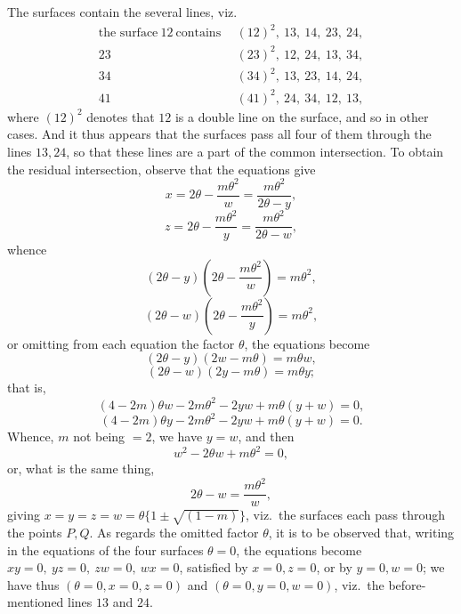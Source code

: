 \documentclass[11pt]{article}
\begin{document}
The surfaces contain the several lines, viz.
\begin{align*}
\text{the surface}\ 12\ \text{contains} &\ \ (12)^{2},\ 13,\ 14,\ 23,\ 24,\\
23\ &\ \ (23)^{2},\ 12,\ 24,\ 13,\ 34,\\
34\ &\ \ (34)^{2},\ 13,\ 23,\ 14,\ 24,\\
41\ &\ \ (41)^{2},\ 24,\ 34,\ 12,\ 13,
\end{align*}
where $(12)^{2}$ denotes that $12$ is a double line on the surface, and so in other
cases. And it thus appears that the surfaces pass all four of them through the lines
$13,24$, so that these lines are a part of the common intersection. To obtain the
residual intersection, observe that the equations give
\[
x=2\theta-\frac{m\theta^{2}}{w}=\frac{m\theta^{2}}{2\theta-y},
\]
\[
z=2\theta-\frac{m\theta^{2}}{y}=\frac{m\theta^{2}}{2\theta-w},
\]
whence
\[
(2\theta-y)\!\left(2\theta-\frac{m\theta^{2}}{w}\right)=m\theta^{2},
\]
\[
(2\theta-w)\!\left(2\theta-\frac{m\theta^{2}}{y}\right)=m\theta^{2},
\]
or omitting from each equation the factor $\theta$, the equations become
\[
(2\theta-y)(2w-m\theta)=m\theta w,
\]
\[
(2\theta-w)(2y-m\theta)=m\theta y;
\]
that is,
\[
(4-2m)\theta w-2m\theta^{2}-2yw+m\theta(y+w)=0,
\]
\[
(4-2m)\theta y-2m\theta^{2}-2yw+m\theta(y+w)=0.
\]
Whence, $m$ not being $=2$, we have $y=w$, and then
\[
w^{2}-2\theta w+m\theta^{2}=0,
\]
or, what is the same thing,
\[
2\theta-w=\frac{m\theta^{2}}{w},
\]
giving $x=y=z=w=\theta\{1\pm\sqrt{(1-m)}\}$, viz.\ the surfaces each pass through the
points $P,Q$. As regards the omitted factor $\theta$, it is to be observed that, writing
in the equations of the four surfaces $\theta=0$, the equations become
$xy=0,\ yz=0,\ zw=0,\ wx=0$, satisfied by $x=0,z=0$, or by $y=0,w=0$; we have thus
$(\theta=0,x=0,z=0)$ and $(\theta=0,y=0,w=0)$, viz.\ the before-mentioned lines $13$ and
$24$.
\end{document}
